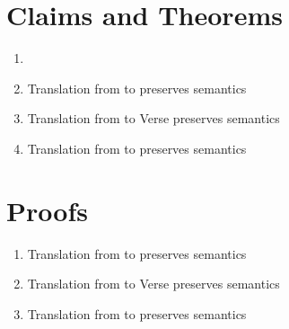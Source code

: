 \documentclass[]{article}
\begin{document}
\section{Claims and Theorems}

\begin{enumerate}
    \item 
    \item Translation from \VMinus to \D preserves semantics 
    \item Translation from \VMinus to Verse preserves semantics
    \item Translation from \PPlus to \VMinus preserves semantics 
\end{enumerate}

\section{Proofs}
\begin{enumerate}
    \item Translation from \VMinus to \D preserves semantics 
    \item Translation from \VMinus to Verse preserves semantics
    \item Translation from \PPlus to \VMinus preserves semantics 
\end{enumerate}
\end{document}
